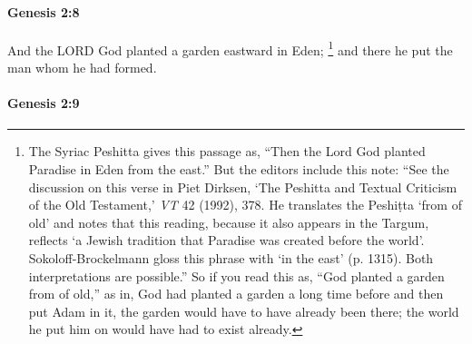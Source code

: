 		\paragraph{Genesis 2:8} %
			\label{GENESIS-2-8}

			And the LORD God planted a garden eastward in Eden;%
				\footnote{%
					The Syriac Peshitta gives this passage as, ``Then the Lord God planted Paradise in Eden from the east.'' But the editors include this note: ``See the discussion on this verse in Piet Dirksen, `The Peshitta and Textual Criticism of the Old Testament,' \textit{VT} 42 (1992), 378. He translates the Peshi\d{t}ta `from of old' and notes that this reading, because it also appears in the Targum, reflects `a Jewish tradition that Paradise was created before the world'. Sokoloff-Brockelmann gloss this phrase with `in the east' (p. 1315). Both interpretations are possible.'' So if you read this as, ``God planted a garden from of old,'' as in, God had planted a garden a long time before and then put Adam in it, the garden would have to have already been there; the world he put him on would have had to exist already.
					}
			and there he put the man whom he had formed.


		\paragraph{Genesis 2:9} %
			\label{GENESIS-2-9}

